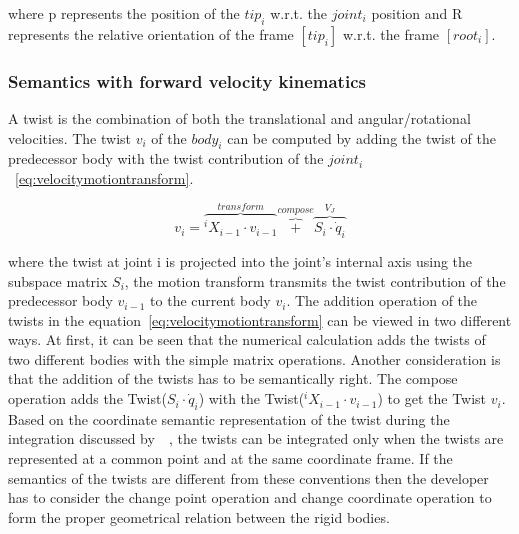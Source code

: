 where p represents the position of the $tip_i$ w.r.t. the $joint_i$ position and R represents the relative orientation of the frame $[tip_i]$ w.r.t. the frame $[root_i]$.

\subsubsection*{Semantics with forward velocity kinematics}

A twist is the combination of both the translational and angular/rotational velocities. The twist $v_i$ of the $body_i$ can be computed by adding the twist of the predecessor body with the twist contribution of the $joint_i$~\eqref{eq:velocitymotiontransform}.

\begin{equation}
v_i = \overbrace{^iX_{i-1}\cdot v_{i-1}}^{transform} \overbrace{+}^{compose}  \overbrace{S_i\cdot \dot{q}_i}^{V_J}
\label{eq:velocitymotiontransform}
\end{equation}

where the twist at joint i is projected into the joint's internal axis using the subspace matrix $S_i$, the motion transform transmits the twist contribution of the predecessor body $v_{i-1}$ to the current body $v_i$. The addition operation of the twists in the equation~\eqref{eq:velocitymotiontransform} can be viewed in two different ways. At first, it can be seen that the numerical calculation adds the twists of two different bodies with the simple matrix operations. Another consideration is that the addition of the twists has to be semantically right. The compose operation adds the Twist($S_i\cdot \dot{q}_i$) with the Twist($^iX_{i-1}\cdot v_{i-1}$) to get the Twist $v_i$. Based on the coordinate semantic representation of the twist during the integration discussed by~\cite{geometicsemanticspart1}~\cite{geometicsemanticspart2}, the twists can be integrated only when the twists are represented at a common point and at the same coordinate frame. If the semantics of the twists are different from these conventions then the developer has to consider the change point operation and change coordinate operation to form the proper geometrical relation between the rigid bodies.


